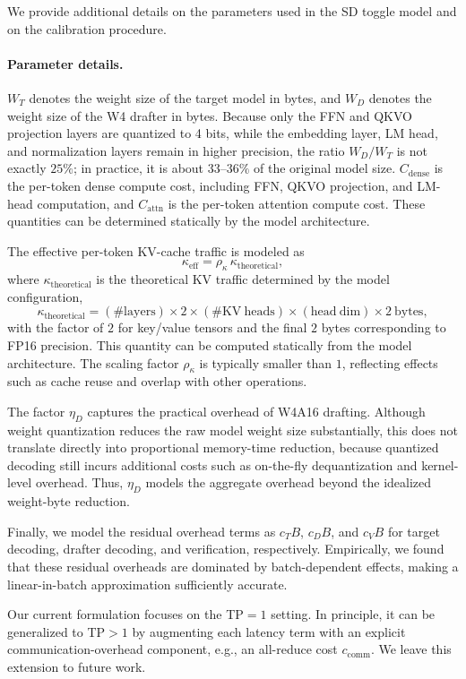 \documentclass{llmxive}
\begin{document}
We provide additional details on the parameters used in the SD toggle model and on the calibration procedure.

\paragraph{Parameter details.}
$W_T$ denotes the weight size of the target model in bytes, and $W_D$ denotes the weight size of the W4 drafter in bytes.
Because only the FFN and QKVO projection layers are quantized to 4 bits, while the embedding layer, LM head, and normalization layers remain in higher precision, the ratio $W_D/W_T$ is not exactly $25\%$; in practice, it is about $33$--$36\%$ of the original model size.
$C_{\mathrm{dense}}$ is the per-token dense compute cost, including FFN, QKVO projection, and LM-head computation, and $C_{\mathrm{attn}}$ is the per-token attention compute cost.
These quantities can be determined statically by the model architecture.

The effective per-token KV-cache traffic is modeled as
\[
\kappa_{\mathrm{eff}} = \rho_{\kappa}\,\kappa_{\mathrm{theoretical}},
\]
where $\kappa_{\mathrm{theoretical}}$ is the theoretical KV traffic determined by the model configuration,
\[
\kappa_{\mathrm{theoretical}}
=
(\#\mathrm{layers})
\times 2
\times (\#\mathrm{KV\ heads})
\times (\mathrm{head\ dim})
\times 2~\mathrm{bytes},
\]
with the factor of $2$ for key/value tensors and the final $2$ bytes corresponding to FP16 precision.
This quantity can be computed statically from the model architecture.
The scaling factor $\rho_{\kappa}$ is typically smaller than $1$, reflecting effects such as cache reuse and overlap with other operations.

The factor $\eta_D$ captures the practical overhead of W4A16 drafting.
Although weight quantization reduces the raw model weight size substantially, this does not translate directly into proportional memory-time reduction, because quantized decoding still incurs additional costs such as on-the-fly dequantization and kernel-level overhead.
Thus, $\eta_D$ models the aggregate overhead beyond the idealized weight-byte reduction.

Finally, we model the residual overhead terms as $c_T B$, $c_D B$, and $c_V B$ for target decoding, drafter decoding, and verification, respectively.
Empirically, we found that these residual overheads are dominated by batch-dependent effects, making a linear-in-batch approximation sufficiently accurate.

Our current formulation focuses on the TP$=1$ setting.
In principle, it can be generalized to TP$>1$ by augmenting each latency term with an explicit communication-overhead component, e.g., an all-reduce cost $c_{\mathrm{comm}}$.
We leave this extension to future work.
\end{document}
